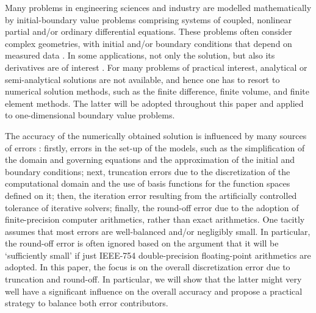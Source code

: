 \documentclass[review,3p]{elsarticle}
\begin{document}
Many problems in engineering sciences and industry are modelled mathematically by initial-boundary value problems comprising systems of coupled, nonlinear partial and/or ordinary differential equations. These problems often consider complex geometries, with initial and/or boundary conditions that depend on measured data \cite{Kumar2016}. 
In some applications, not only the solution, but also its derivatives are of interest \cite{Kumar2016,carey1982derivative}.
For many problems of practical interest, analytical or semi-analytical solutions are not available, and hence one has to resort to numerical solution methods, such as the finite difference, finite volume, and finite element methods. The latter will be adopted throughout this paper and applied to one-dimensional boundary value problems.

The accuracy of the numerically obtained solution is influenced by many sources of errors \cite{ferziger2012computational}: firstly, errors in the set-up of the models, such as the simplification of the domain and governing equations and the approximation of the initial and boundary conditions; next, truncation errors due to the discretization of the computational domain and the use of basis functions for the function spaces defined on it; then, the iteration error resulting from the artificially controlled tolerance of iterative solvers; finally, the round-off error due to the adoption of finite-precision computer arithmetics, rather than exact arithmetics.
One tacitly assumes that most errors are well-balanced and/or negligibly small.
In particular, the round-off error is often ignored based on the argument that it will be `sufficiently small' if just IEEE-754 double-precision floating-point arithmetics \cite{zuras2008ieee} are adopted.
In this paper, the focus is on the overall discretization error due to truncation and round-off. In particular, we will show that the latter might very well have a significant influence on the overall accuracy and propose a practical strategy to balance both error contributors.
\end{document}
